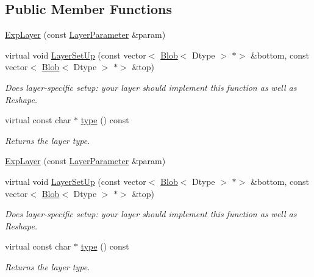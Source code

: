 \subsection*{Public Member Functions}
\begin{DoxyCompactItemize}
\item 
\mbox{\hyperlink{classcaffe_1_1_exp_layer_a87a0fae261ad3d2c8947f463686a6de0}{Exp\+Layer}} (const \mbox{\hyperlink{classcaffe_1_1_layer_parameter}{Layer\+Parameter}} \&param)
\item 
virtual void \mbox{\hyperlink{classcaffe_1_1_exp_layer_a45ec267bdfd48e8aa34490e146405b9e}{Layer\+Set\+Up}} (const vector$<$ \mbox{\hyperlink{classcaffe_1_1_blob}{Blob}}$<$ Dtype $>$ $\ast$$>$ \&bottom, const vector$<$ \mbox{\hyperlink{classcaffe_1_1_blob}{Blob}}$<$ Dtype $>$ $\ast$$>$ \&top)
\begin{DoxyCompactList}\small\item\em Does layer-\/specific setup\+: your layer should implement this function as well as Reshape. \end{DoxyCompactList}\item 
\mbox{\label{classcaffe_1_1_exp_layer_a1f99d76f8356e7698f7a2e0f70fa5b85}} 
virtual const char $\ast$ \mbox{\hyperlink{classcaffe_1_1_exp_layer_a1f99d76f8356e7698f7a2e0f70fa5b85}{type}} () const
\begin{DoxyCompactList}\small\item\em Returns the layer type. \end{DoxyCompactList}\item 
\mbox{\hyperlink{classcaffe_1_1_exp_layer_a87a0fae261ad3d2c8947f463686a6de0}{Exp\+Layer}} (const \mbox{\hyperlink{classcaffe_1_1_layer_parameter}{Layer\+Parameter}} \&param)
\item 
virtual void \mbox{\hyperlink{classcaffe_1_1_exp_layer_ad482cfebeedd32e7b7d146106ece981a}{Layer\+Set\+Up}} (const vector$<$ \mbox{\hyperlink{classcaffe_1_1_blob}{Blob}}$<$ Dtype $>$ $\ast$$>$ \&bottom, const vector$<$ \mbox{\hyperlink{classcaffe_1_1_blob}{Blob}}$<$ Dtype $>$ $\ast$$>$ \&top)
\begin{DoxyCompactList}\small\item\em Does layer-\/specific setup\+: your layer should implement this function as well as Reshape. \end{DoxyCompactList}\item 
\mbox{\label{classcaffe_1_1_exp_layer_a1f99d76f8356e7698f7a2e0f70fa5b85}} 
virtual const char $\ast$ \mbox{\hyperlink{classcaffe_1_1_exp_layer_a1f99d76f8356e7698f7a2e0f70fa5b85}{type}} () const
\begin{DoxyCompactList}\small\item\em Returns the layer type. \end{DoxyCompactList}\end{DoxyCompactItemize}
